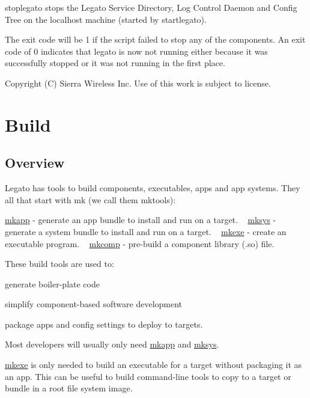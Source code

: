 stoplegato stops the Legato Service Directory, Log Control Daemon and Config Tree on the localhost machine (started by startlegato).

The exit code will be 1 if the script failed to stop any of the components. An exit code of 0 indicates that legato is now not running either because it was successfully stopped or it was not running in the first place.



 Copyright (C) Sierra Wireless Inc. Use of this work is subject to license. \hypertarget{buildTools}{}\section{Build}\label{buildTools}
\hypertarget{build_tools_buildTools_mktoolsOverview}{}\subsection{Overview}\label{build_tools_buildTools_mktoolsOverview}
Legato has tools to build components, executables, apps and app systems. They all that start with {\ttfamily mk} (we call them {\ttfamily mktools})\+: ~\newline


\hyperlink{buildToolsmkapp}{mkapp} -\/ generate an app bundle to install and run on a target. ~\newline
 \hyperlink{buildToolsmksys}{mksys} -\/ generate a system bundle to install and run on a target. ~\newline
 \hyperlink{buildToolsmkexe}{mkexe} -\/ create an executable program. ~\newline
 \hyperlink{buildToolsmkcomp}{mkcomp} -\/ pre-\/build a component library ({\ttfamily .so}) file. ~\newline


These build tools are used to\+:
\begin{DoxyItemize}
\item generate boiler-\/plate code
\item simplify component-\/based software development
\item package apps and config settings to deploy to targets.
\end{DoxyItemize}

Most developers will usually only need \hyperlink{buildToolsmkapp}{mkapp} and \hyperlink{buildToolsmksys}{mksys}.

\hyperlink{buildToolsmkexe}{mkexe} is only needed to build an executable for a target without packaging it as an app. This can be useful to build command-\/line tools to copy to a target or bundle in a root file system image.


